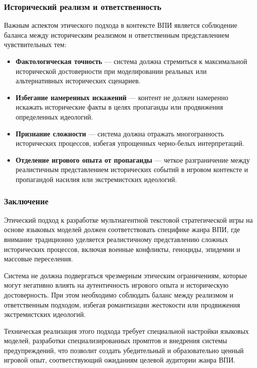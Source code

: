 \subsubsection{Исторический реализм и ответственность}

Важным аспектом этического подхода в контексте ВПИ является соблюдение баланса между историческим реализмом и ответственным представлением чувствительных тем:

\begin{itemize}
    \item \textbf{Фактологическая точность} — система должна стремиться к максимальной исторической достоверности при моделировании реальных или альтернативных исторических сценариев.

    \item \textbf{Избегание намеренных искажений} — контент не должен намеренно искажать исторические факты в целях пропаганды или продвижения определенных идеологий.

    \item \textbf{Признание сложности} — система должна отражать многогранность исторических процессов, избегая упрощенных черно-белых интерпретаций.

    \item \textbf{Отделение игрового опыта от пропаганды} — четкое разграничение между реалистичным представлением исторических событий в игровом контексте и пропагандой насилия или экстремистских идеологий.
\end{itemize}

\subsubsection{Заключение}

Этический подход к разработке мультиагентной текстовой стратегической игры на основе языковых моделей должен соответствовать специфике жанра ВПИ, где внимание традиционно уделяется реалистичному представлению сложных исторических процессов, включая военные конфликты, геноциды, эпидемии и массовые переселения.

Система не должна подвергаться чрезмерным этическим ограничениям, которые могут негативно влиять на аутентичность игрового опыта и историческую достоверность. При этом необходимо соблюдать баланс между реализмом и ответственным подходом, избегая романтизации жестокости или продвижения экстремистских идеологий.

Техническая реализация этого подхода требует специальной настройки языковых моделей, разработки специализированных промптов и внедрения системы предупреждений, что позволит создать убедительный и образовательно ценный игровой опыт, соответствующий ожиданиям целевой аудитории жанра ВПИ.